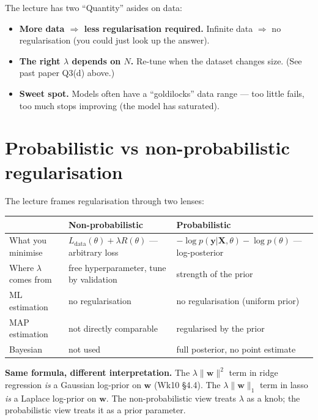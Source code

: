 \documentclass[11pt, a4paper]{article}
\newcommand{\thead}[1]{\textbf{#1}}
\begin{document}
The lecture has two ``Quantity'' asides on data:
\begin{itemize}
  \item \textbf{More data $\Rightarrow$ less regularisation required.} Infinite data $\Rightarrow$ no regularisation (you could just look up the answer).
  \item \textbf{The right $\lambda$ depends on $N$.} Re-tune when the dataset changes size. (See past paper Q3(d) above.)
  \item \textbf{Sweet spot.} Models often have a ``goldilocks'' data range — too little fails, too much stops improving (the model has saturated).
\end{itemize}

\section{Probabilistic vs non-probabilistic regularisation}

The lecture frames regularisation through two lenses:

\begin{tabularx}{\linewidth}{@{}lXX@{}}
\toprule
& \thead{Non-probabilistic} & \thead{Probabilistic} \\
\midrule
What you minimise   & $L_{\text{data}}(\theta) + \lambda R(\theta)$ — arbitrary loss & $-\log p(\mathbf{y}|\mathbf{X},\theta) - \log p(\theta)$ — log-posterior \\
Where $\lambda$ comes from & free hyperparameter, tune by validation & strength of the prior \\
ML estimation       & no regularisation                              & no regularisation (uniform prior) \\
MAP estimation      & not directly comparable                         & regularised by the prior \\
Bayesian            & not used                                        & full posterior, no point estimate \\
\bottomrule
\end{tabularx}

\textbf{Same formula, different interpretation.} The $\lambda\|\mathbf{w}\|^2$ term in ridge regression \emph{is} a Gaussian log-prior on $\mathbf{w}$ (Wk10 §4.4). The $\lambda\|\mathbf{w}\|_1$ term in lasso \emph{is} a Laplace log-prior on $\mathbf{w}$. The non-probabilistic view treats $\lambda$ as a knob; the probabilistic view treats it as a prior parameter.
\end{document}
